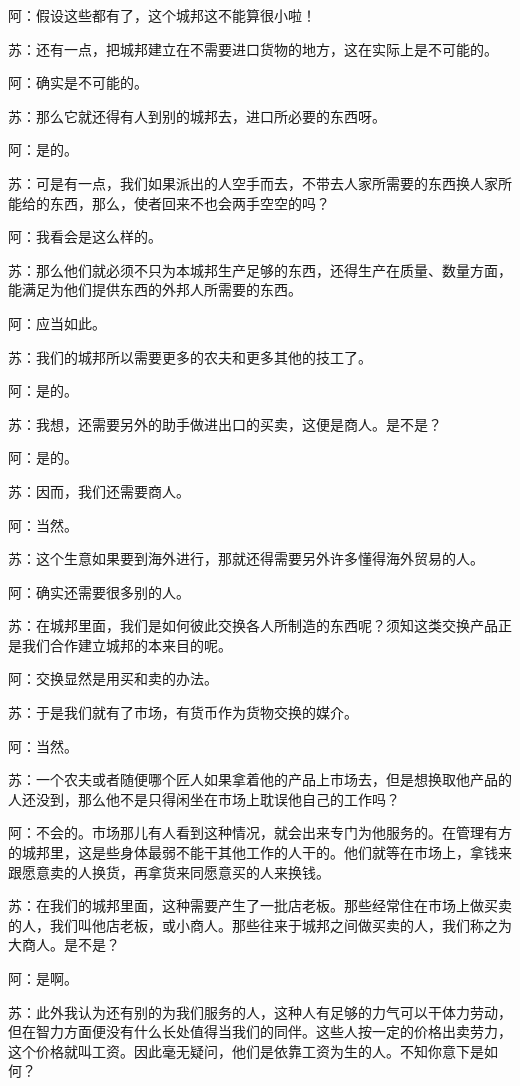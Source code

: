 \documentclass[11pt,oneside]{book}
\begin{document}
\begin{common-format}
阿：假设这些都有了，这个城邦这不能算很小啦！

苏：还有一点，把城邦建立在不需要进口货物的地方，这在实际上是不可能的。

阿：确实是不可能的。

苏：那么它就还得有人到别的城邦去，进口所必要的东西呀。

阿：是的。

苏：可是有一点，我们如果派出的人空手而去，不带去人家所需要的东西换人家所能给的东西，那么，使者回来不也会两手空空的吗？

阿：我看会是这么样的。

苏：那么他们就必须不只为本城邦生产足够的东西，还得生产在质量、数量方面，能满足为他们提供东西的外邦人所需要的东西。

阿：应当如此。

苏：我们的城邦所以需要更多的农夫和更多其他的技工了。

阿：是的。

苏：我想，还需要另外的助手做进出口的买卖，这便是商人。是不是？

阿：是的。

苏：因而，我们还需要商人。

阿：当然。

苏：这个生意如果要到海外进行，那就还得需要另外许多懂得海外贸易的人。

阿：确实还需要很多别的人。

苏：在城邦里面，我们是如何彼此交换各人所制造的东西呢？须知这类交换产品正是我们合作建立城邦的本来目的呢。

阿：交换显然是用买和卖的办法。

苏：于是我们就有了市场，有货币作为货物交换的媒介。

阿：当然。

苏：一个农夫或者随便哪个匠人如果拿着他的产品上市场去，但是想换取他产品的人还没到，那么他不是只得闲坐在市场上耽误他自己的工作吗？

阿：不会的。市场那儿有人看到这种情况，就会出来专门为他服务的。在管理有方的城邦里，这是些身体最弱不能干其他工作的人干的。他们就等在市场上，拿钱来跟愿意卖的人换货，再拿货来同愿意买的人来换钱。

苏：在我们的城邦里面，这种需要产生了一批店老板。那些经常住在市场上做买卖的人，我们叫他店老板，或小商人。那些往来于城邦之间做买卖的人，我们称之为大商人。是不是？

阿：是啊。

苏：此外我认为还有别的为我们服务的人，这种人有足够的力气可以干体力劳动，但在智力方面便没有什么长处值得当我们的同伴。这些人按一定的价格出卖劳力，这个价格就叫工资。因此毫无疑问，他们是依靠工资为生的人。不知你意下是如何？


\end{common-format}
\end{document}
